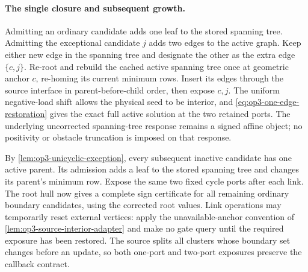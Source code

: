 \paragraph{The single closure and subsequent growth.}
Admitting an ordinary candidate adds one leaf to the stored spanning tree.
Admitting the exceptional candidate $j$ adds two edges to the active graph.
Keep either new edge in the spanning tree and designate the other as the
extra edge $\{c,j\}$. Re-root and rebuild the cached active spanning tree
once at geometric anchor $c$, re-homing its current minimum rows. Insert
its edges through the source interface in parent-before-child order, then
expose $c,j$. The uniform negative-load shift allows the physical seed to
be interior, and \eqref{eq:op3-one-edge-restoration} gives the exact full
active solution at the two retained ports. The underlying uncorrected
spanning-tree response remains a signed affine object; no positivity or
obstacle truncation is imposed on that response.

By \cref{lem:op3-unicyclic-exception}, every subsequent inactive candidate
has one active parent. Its admission adds a leaf to the stored spanning
tree and changes its parent's minimum row. Expose the same two fixed cycle
ports after each link. The root hull now gives a complete sign certificate
for all remaining ordinary boundary candidates, using the corrected root
values. Link operations may temporarily reset external vertices: apply the
unavailable-anchor convention of \cref{lem:op3-source-interior-adapter}
and make no gate query until the required exposure has been restored.
The source splits all clusters whose boundary set changes before an update,
so both one-port and two-port exposures preserve the callback contract.

